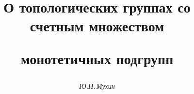 

 


%  


 


\newcommand{\la}{\langle} 


\newcommand{\ra}{\rangle} 


\newcommand{\Aut}{\operatorname{Aut}} 


\newcommand{\Mod}{\operatorname{mod}} 


\newcommand{\tts}[1]{} 


 




\setcounter{page}{53} 












 


\author{\it Ю.Н.\,Мухин} 




\title{О топологических группах со счетным множеством 


монотетичных подгрупп} 


 


\date{} 




\pagestyle{plain} %


 




